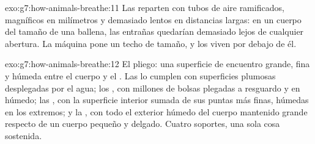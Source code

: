 \begin{solution}{exo:g7:how-animals-breathe:11}
Las  reparten con tubos de aire ramificados, magníficos en
milímetros y demasiado lentos en distancias largas: en un cuerpo del
tamaño de una ballena, las entrañas quedarían demasiado lejos de
cualquier abertura. La máquina pone un techo de tamaño, y los 
viven por debajo de él.
\end{solution}

\begin{solution}{exo:g7:how-animals-breathe:12}
El pliego: una superficie de encuentro grande, fina y húmeda entre el
cuerpo y el . Las  lo cumplen con superficies plumosas
desplegadas por el agua; los , con millones de bolsas plegadas
a resguardo y en húmedo; las , con la superficie interior sumada
de sus puntas más finas, húmedas en los extremos; y la , con todo el
exterior húmedo del cuerpo mantenido grande respecto de un cuerpo
pequeño y delgado. Cuatro soportes, una sola cosa sostenida.
\end{solution}

